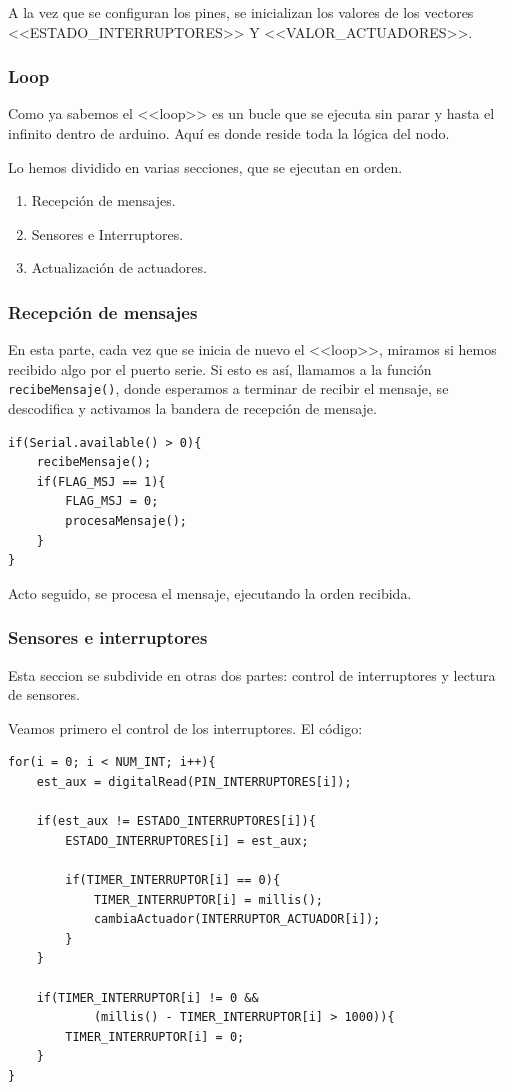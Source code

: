 A la vez que se configuran los pines, se inicializan los valores de los vectores <<ESTADO\_INTERRUPTORES>> Y <<VALOR\_ACTUADORES>>.

\subsubsection{Loop}
Como ya sabemos el <<loop>> es un bucle que se ejecuta sin parar y hasta el infinito dentro de arduino. Aquí es donde reside toda la lógica del nodo.

Lo hemos dividido en varias secciones, que se ejecutan en orden.

\begin{enumerate}
    \item Recepción de mensajes.
    \item Sensores e Interruptores.
    \item Actualización de actuadores.
\end{enumerate}

\subsubsection{Recepción de mensajes}
En esta parte, cada vez que se inicia de nuevo el <<loop>>, miramos si hemos recibido algo por el puerto serie. Si esto es así, llamamos a la función \lstinline|recibeMensaje()|, donde esperamos a terminar de recibir el mensaje, se descodifica y activamos la bandera de recepción de mensaje.

\begin{lstlisting}
if(Serial.available() > 0){
    recibeMensaje();
    if(FLAG_MSJ == 1){
        FLAG_MSJ = 0;
        procesaMensaje();
    }
}
\end{lstlisting}

Acto seguido, se procesa el mensaje, ejecutando la orden recibida.

\subsubsection{Sensores e interruptores}
Esta seccion se subdivide en otras dos partes: control de interruptores y lectura de sensores.

Veamos primero el control de los interruptores. El código:
\begin{lstlisting}
for(i = 0; i < NUM_INT; i++){
    est_aux = digitalRead(PIN_INTERRUPTORES[i]);

    if(est_aux != ESTADO_INTERRUPTORES[i]){
        ESTADO_INTERRUPTORES[i] = est_aux;

        if(TIMER_INTERRUPTOR[i] == 0){
            TIMER_INTERRUPTOR[i] = millis();
            cambiaActuador(INTERRUPTOR_ACTUADOR[i]);
        }
    }

    if(TIMER_INTERRUPTOR[i] != 0 && 
            (millis() - TIMER_INTERRUPTOR[i] > 1000)){
        TIMER_INTERRUPTOR[i] = 0;
    }
}
\end{lstlisting}


